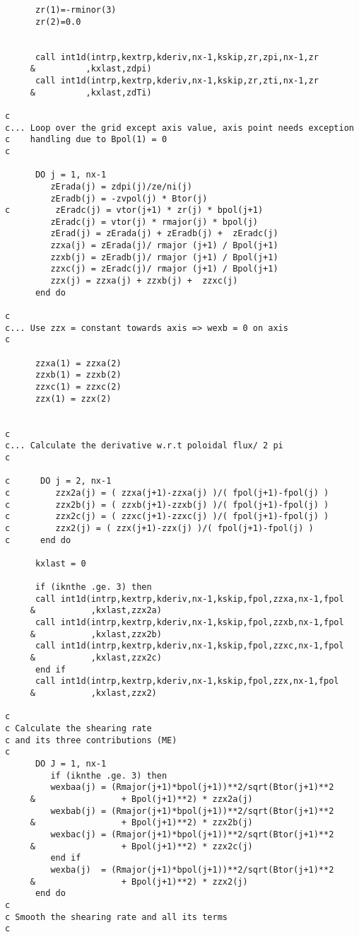 \begin{verbatim}
      zr(1)=-rminor(3)
      zr(2)=0.0


      call int1d(intrp,kextrp,kderiv,nx-1,kskip,zr,zpi,nx-1,zr
     &          ,kxlast,zdpi)
      call int1d(intrp,kextrp,kderiv,nx-1,kskip,zr,zti,nx-1,zr
     &          ,kxlast,zdTi)

c
c... Loop over the grid except axis value, axis point needs exception
c    handling due to Bpol(1) = 0
c

      DO j = 1, nx-1
         zErada(j) = zdpi(j)/ze/ni(j) 
         zEradb(j) = -zvpol(j) * Btor(j) 
c         zEradc(j) = vtor(j+1) * zr(j) * bpol(j+1)
         zEradc(j) = vtor(j) * rmajor(j) * bpol(j)
         zErad(j) = zErada(j) + zEradb(j) +  zEradc(j)
         zzxa(j) = zErada(j)/ rmajor (j+1) / Bpol(j+1)
         zzxb(j) = zEradb(j)/ rmajor (j+1) / Bpol(j+1)
         zzxc(j) = zEradc(j)/ rmajor (j+1) / Bpol(j+1)
         zzx(j) = zzxa(j) + zzxb(j) +  zzxc(j)
      end do

c
c... Use zzx = constant towards axis => wexb = 0 on axis 
c

      zzxa(1) = zzxa(2) 
      zzxb(1) = zzxb(2) 
      zzxc(1) = zzxc(2) 
      zzx(1) = zzx(2) 


c
c... Calculate the derivative w.r.t poloidal flux/ 2 pi
c

c      DO j = 2, nx-1
c         zzx2a(j) = ( zzxa(j+1)-zzxa(j) )/( fpol(j+1)-fpol(j) )
c         zzx2b(j) = ( zzxb(j+1)-zzxb(j) )/( fpol(j+1)-fpol(j) )
c         zzx2c(j) = ( zzxc(j+1)-zzxc(j) )/( fpol(j+1)-fpol(j) )
c         zzx2(j) = ( zzx(j+1)-zzx(j) )/( fpol(j+1)-fpol(j) )
c      end do

      kxlast = 0 

      if (iknthe .ge. 3) then
      call int1d(intrp,kextrp,kderiv,nx-1,kskip,fpol,zzxa,nx-1,fpol
     &           ,kxlast,zzx2a)
      call int1d(intrp,kextrp,kderiv,nx-1,kskip,fpol,zzxb,nx-1,fpol
     &           ,kxlast,zzx2b)
      call int1d(intrp,kextrp,kderiv,nx-1,kskip,fpol,zzxc,nx-1,fpol
     &           ,kxlast,zzx2c)
      end if
      call int1d(intrp,kextrp,kderiv,nx-1,kskip,fpol,zzx,nx-1,fpol
     &           ,kxlast,zzx2)

c
c Calculate the shearing rate
c and its three contributions (ME)
c
      DO J = 1, nx-1
         if (iknthe .ge. 3) then
         wexbaa(j) = (Rmajor(j+1)*bpol(j+1))**2/sqrt(Btor(j+1)**2 
     &                 + Bpol(j+1)**2) * zzx2a(j)
         wexbab(j) = (Rmajor(j+1)*bpol(j+1))**2/sqrt(Btor(j+1)**2 
     &                 + Bpol(j+1)**2) * zzx2b(j)
         wexbac(j) = (Rmajor(j+1)*bpol(j+1))**2/sqrt(Btor(j+1)**2 
     &                 + Bpol(j+1)**2) * zzx2c(j)
         end if
         wexba(j)  = (Rmajor(j+1)*bpol(j+1))**2/sqrt(Btor(j+1)**2 
     &                 + Bpol(j+1)**2) * zzx2(j)
      end do
c
c Smooth the shearing rate and all its terms
c


\end{verbatim}
